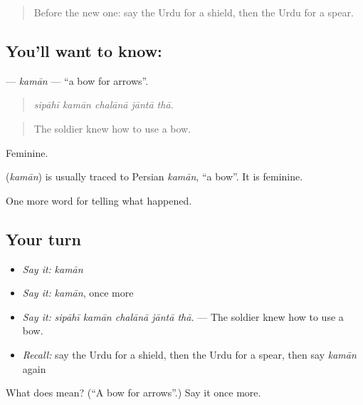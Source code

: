 \begin{quote}
Before the new one: say the Urdu for a shield, then the Urdu for a spear.
\end{quote}

\subsection*{You'll want to know: }
\textbf{} — \emph{kamān} — \textquotedblleft{}a bow for arrows\textquotedblright{}.

\begin{quote}
    
\end{quote}

\begin{quote}
\emph{sipāhī kamān chalānā jāntā thā.}
\end{quote}

\begin{quote}
The soldier knew how to use a bow.
\end{quote}

Feminine.

\begin{cousinweb}
\textbf{} (\emph{kamān}) is usually traced to Persian \emph{kamān}, \textquotedblleft{}a bow\textquotedblright{}. It is feminine.
\end{cousinweb}

\begin{grammarlens}[title={What you've built}]
One more word for telling what happened.
\end{grammarlens}

\subsection*{Your turn}
\begin{itemize}
\raggedright
  \item \emph{Say it:} \emph{kamān}
  \item \emph{Say it:} \emph{kamān}, once more
  \item \emph{Say it:} \emph{sipāhī kamān chalānā jāntā thā.} — The soldier knew how to use a bow.
  \item \emph{Recall:} say the Urdu for a shield, then the Urdu for a spear, then say \emph{kamān} again
\end{itemize}

\begin{tcolorbox}[breakable,colback=teal!4,colframe=teal!35!black,title={Before you move on}]
What does  mean? (\textquotedblleft{}A bow for arrows\textquotedblright{}.) Say it once more.
\end{tcolorbox}
